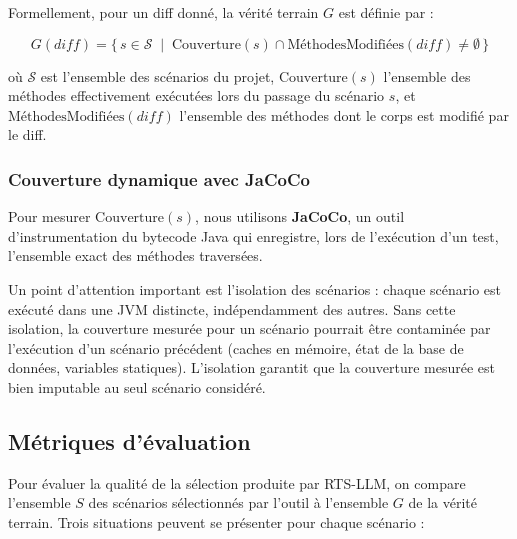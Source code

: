 \documentclass[12pt,a4paper]{article}
\begin{document}
Formellement, pour un diff donné, la vérité terrain $G$ est définie par :

\begin{formulabox}
\[
  G(\mathit{diff}) = \bigl\{\, s \in \mathcal{S}
  \;\mid\;
  \text{Couverture}(s) \cap \text{MéthodesModifiées}(\mathit{diff})
  \neq \emptyset \,\bigr\}
\]
\end{formulabox}

\noindent où $\mathcal{S}$ est l'ensemble des scénarios du projet,
$\text{Couverture}(s)$ l'ensemble des méthodes effectivement exécutées
lors du passage du scénario $s$, et $\text{MéthodesModifiées}(\mathit{diff})$
l'ensemble des méthodes dont le corps est modifié par le diff.

\subsubsection{Couverture dynamique avec JaCoCo}

Pour mesurer $\text{Couverture}(s)$, nous utilisons \textbf{JaCoCo},
un outil d'instrumentation du bytecode Java qui enregistre, lors de
l'exécution d'un test, l'ensemble exact des méthodes traversées.

Un point d'attention important est l'isolation des scénarios : chaque
scénario est exécuté dans une JVM distincte, indépendamment des autres.
Sans cette isolation, la couverture mesurée pour un scénario pourrait
être contaminée par l'exécution d'un scénario précédent (caches en
mémoire, état de la base de données, variables statiques). L'isolation
garantit que la couverture mesurée est bien imputable au seul scénario
considéré.

\subsection{Métriques d'évaluation}

Pour évaluer la qualité de la sélection produite par RTS-LLM, on compare
l'ensemble $S$ des scénarios sélectionnés par l'outil à l'ensemble $G$
de la vérité terrain. Trois situations peuvent se présenter pour chaque
scénario :
\end{document}
